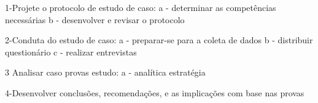 1-Projete o protocolo de estudo de caso:
	a - determinar as competências necessárias
	b - desenvolver e revisar o protocolo

2-Conduta do estudo de caso:
	a - preparar-se para a coleta de dados
	b - distribuir questionário
	c - realizar entrevistas

3 Analisar caso provas estudo:
	a - analítica estratégia

4-Desenvolver conclusões, recomendações, e as implicações com base nas provas